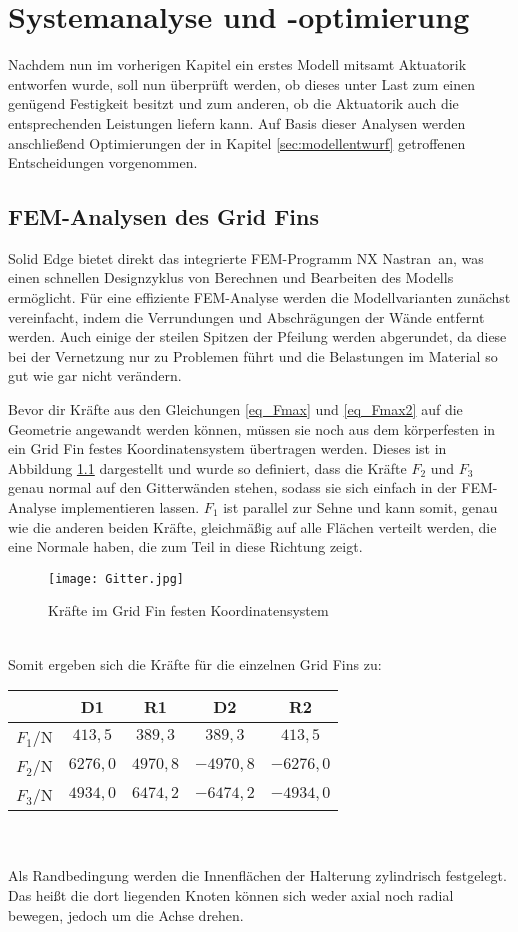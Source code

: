 \chapter{Systemanalyse und -optimierung}\label{sec:simulation}
Nachdem nun im vorherigen Kapitel ein erstes Modell mitsamt Aktuatorik entworfen wurde, soll nun überprüft werden, ob dieses unter Last zum einen genügend Festigkeit besitzt und zum anderen, ob die Aktuatorik auch die entsprechenden Leistungen liefern kann. Auf Basis dieser Analysen werden anschließend Optimierungen der in Kapitel \ref{sec:modellentwurf} getroffenen Entscheidungen vorgenommen.


\section{FEM-Analysen des Grid Fins}
Solid Edge bietet direkt das integrierte FEM-Programm \grqq NX Nastran\grqq \ an, was einen schnellen Designzyklus von Berechnen und Bearbeiten des Modells ermöglicht. Für eine effiziente FEM-Analyse werden die Modellvarianten zunächst vereinfacht, indem die Verrundungen und Abschrägungen der Wände entfernt werden. Auch einige der steilen Spitzen der Pfeilung werden abgerundet, da diese bei der Vernetzung nur zu Problemen führt und die Belastungen im Material so gut wie gar nicht verändern.

Bevor dir Kräfte aus den Gleichungen \ref{eq_Fmax} und \ref{eq_Fmax2} auf die Geometrie angewandt werden können, müssen sie noch aus dem körperfesten in ein Grid Fin festes Koordinatensystem übertragen werden. Dieses ist in Abbildung \ref{abb_gitter} dargestellt und wurde so definiert, dass die Kräfte $F_2$ und $F_3$ genau normal auf den Gitterwänden stehen, sodass sie sich einfach in der FEM-Analyse implementieren lassen. $F_1$ ist parallel zur Sehne und kann somit, genau wie die anderen beiden Kräfte, gleichmäßig auf alle Flächen verteilt werden, die eine Normale haben, die zum Teil in diese Richtung zeigt.
\begin{figure}[h] 
	\centering
	\texttt{[image: Gitter.jpg]}
	\caption{Kräfte im Grid Fin festen Koordinatensystem}
	\label{abb_gitter}
\end{figure}\\
Somit ergeben sich die Kräfte für die einzelnen Grid Fins zu:
\begin{table}[ht]
	\centering
	\begin{tabular}{c||c|c|c|c}
		&D1&R1&D2&R2\\
		\hline
		$F_1/$N&$413,5$&$389,3$&$389,3$&$413,5$\\
		$F_2/$N&$6276,0$&$4970,8$&$-4970,8$&$-6276,0$\\
		$F_3/$N&$4934,0$&$6474,2$&$-6474,2$&$-4934,0$\\
	\end{tabular}
\end{table}\\~\\
Als Randbedingung werden die Innenflächen der Halterung zylindrisch festgelegt. Das heißt die dort liegenden Knoten können sich weder axial noch radial bewegen, jedoch um die Achse drehen.
